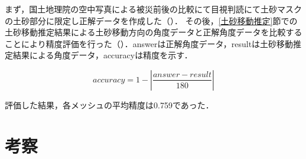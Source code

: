     まず，国土地理院の空中写真による被災前後の比較\cite{使用データ3}にて目視判読にて土砂マスクの土砂部分に限定し正解データを作成した（\fref{}）． その後，\ref{土砂移動推定}節での土砂移動推定結果による土砂移動方向の角度データと正解角度データを比較することにより精度評価を行った（）．answerは正解角度データ，resultは土砂移動推定結果による角度データ，accuracyは精度を示す．
    
    \begin{equation}
      \label{精度評価}
      accuracy = 1 - |\dfrac{answer - result} {180}|
    \end{equation}

    評価した結果，各メッシュの平均精度は0.759であった．


  \section{考察}
